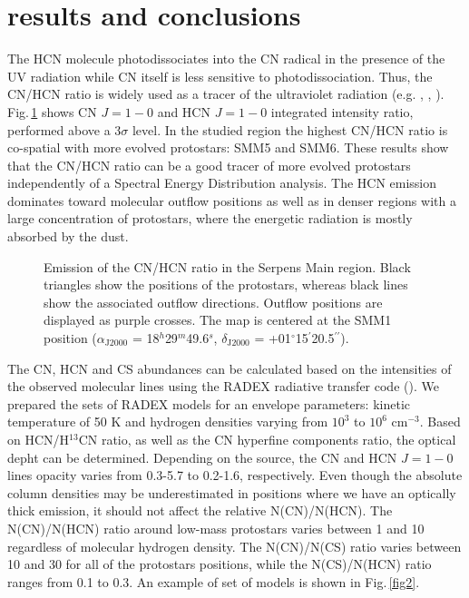 \documentclass[a4paper]{article}
\begin{document}
\section*{\sc results and conclusions}
\indent \indent The HCN molecule photodissociates into the CN radical in the presence of the UV radiation while CN itself is less sensitive to photodissociation. Thus, the CN/HCN ratio is widely used as a tracer of the ultraviolet radiation (e.g. \cite{fuente1995},  \cite{chapillon2012}, \cite{riaz2018}). Fig.\,\ref{fig1} shows CN $J=1-0$ and HCN $J=1-0$ integrated intensity ratio, performed above a $3\sigma$ level. In the studied region the highest CN/HCN ratio is co-spatial with more evolved protostars: SMM5 and SMM6. These results show that the CN/HCN ratio can be a good tracer of more evolved protostars independently of a Spectral Energy Distribution analysis. The HCN emission dominates toward molecular outflow positions as well as in denser regions with a large concentration of protostars, where the energetic radiation is mostly absorbed by the dust.

\begin{figure}[!h]
\centering
{}
\caption{Emission of the CN/HCN ratio in the Serpens Main region. Black triangles show the positions of the protostars, whereas black lines show the associated outflow directions. Outflow positions are displayed as purple crosses. The map is centered at the SMM1 position ($\alpha_\mathrm{J2000}$ = 18$^h$29$^m$49.6$^s$, $\delta_\mathrm{J2000}$ = +01$^{\circ}$15$^{\prime}$20.5$^{\prime\prime}$).}
\label{fig1}
\end{figure}

\indent \indent The CN, HCN and CS abundances can be calculated based on the intensities of the observed molecular lines using the RADEX radiative transfer code (\cite{tak2007}). We prepared the sets of RADEX models for an envelope parameters: kinetic temperature of 50 K and hydrogen densities varying from $10^3$ to $10^6$ cm$^{-3}$. Based on HCN/H$^{13}$CN ratio, as well as the CN hyperfine components ratio, the optical depht can be determined. Depending on the source, the CN and HCN $J=1-0$ lines opacity varies from 0.3-5.7 to 0.2-1.6, respectively. Even though the absolute column densities may be underestimated in positions where we have an optically thick emission, it should not affect the relative N(CN)/N(HCN). The N(CN)/N(HCN) ratio around low-mass protostars varies between 1 and 10 regardless of molecular hydrogen density. The N(CN)/N(CS) ratio varies between 10 and 30 for all of the protostars positions, while the N(CS)/N(HCN) ratio ranges from 0.1 to 0.3. An example of set of models is shown in Fig.\,\ref{fig2}.
\end{document}

